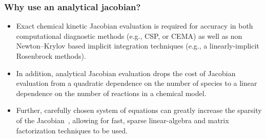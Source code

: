 \documentclass{beamer}
\begin{document}
\begin{frame}
\frametitle{Why use an analytical jacobian?}
\begin{itemize}
 \item Exact chemical kinetic Jacobian evaluation is required for accuracy in both computational diagnostic methods (e.g., CSP, or CEMA) as well as non Newton--Krylov based implicit integration techniques (e.g., a linearly-implicit Rosenbrock methods).
 \item In addition, analytical Jacobian evaluation drops the cost of Jacobian evaluation from a quadratic dependence on the number of species to a linear dependence on the number of reactions in a chemical model.
 \item Further, carefully chosen system of equations can greatly increase the sparsity of the Jacobian~, allowing for fast, sparse linear-algebra and matrix factorization techniques to be used.
\end{itemize}
\end{frame}
\end{document}
